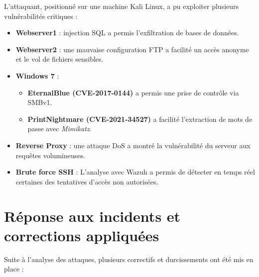 \documentclass[a4paper,12pt]{report}
\begin{document}
L'attaquant, positionné sur une machine Kali Linux, a pu exploiter plusieurs vulnérabilités critiques :

\begin{itemize}
    \item \textbf{Webserver1} : injection SQL a permis l’exfiltration de bases de données.
    \item \textbf{Webserver2} : une mauvaise configuration FTP a facilité un accès anonyme et le vol de fichiers sensibles.
    \item \textbf{Windows 7} :
    \begin{itemize}
        \item \textbf{EternalBlue (CVE-2017-0144)} a permis une prise de contrôle via SMBv1.
        \item \textbf{PrintNightmare (CVE-2021-34527)} a facilité l’extraction de mots de passe avec \textit{Mimikatz}.
    \end{itemize}
    \item \textbf{Reverse Proxy} : une attaque DoS a montré la vulnérabilité du serveur aux requêtes volumineuses.
    \item \textbf{Brute force SSH} : L’analyse avec Wazuh a permis de détecter en temps réel certaines des tentatives d’accès non autorisées.
\end{itemize}

\section{Réponse aux incidents et corrections appliquées}

Suite à l’analyse des attaques, plusieurs correctifs et durcissements ont été mis en place :
\end{document}
